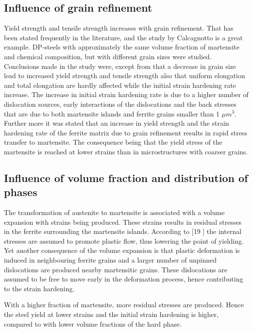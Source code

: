 \documentclass{article}
\begin{document}
\subsection{Influence of grain refinement}
Yield strength and tensile strength increases with grain refinement. That has been stated frequently in the literature, and the study by Calcagnotto is a great example. DP-steels with approximately the same volume fraction of martensite and chemical composition, but with different grain sizes were studied. Conclusions made in the study were, except from that a decrease in grain size lead to increased yield strength and tensile strength also that uniform elongation and total elongation are hardly affected while the initial strain hardening rate increase. The increase in initial strain hardening rate is due to a higher number of dislocation sources, early interactions of the dislocations and the back stresses that are due to both martensite islands and ferrite grains smaller than 1 $\mu m^3$. Further more it was stated that an increase in yield strength and the strain hardening rate of the ferrite matrix due to grain refinement results in rapid stress transfer to martensite. The consequence being that the yield stress of the martensite is reached at lower strains than in microstructures with coarser grains. 

\subsection{Influence of volume fraction and distribution of phases}
The transformation of austenite to martensite is associated with a volume expansion with strains being produced. These strains results in residual stresses in the ferrite surrounding the martensite islands. According to [19 ] the internal stresses are assumed to promote plastic flow, thus lowering the point of yielding. Yet another consequence of the volume expansion is that plastic deformation is induced in neighbouring ferrite grains and a larger number of unpinned dislocations are produced nearby martensitic grains. These dislocations are assumed to be free to move early in the deformation process, hence contributing to the strain hardening. 

With a higher fraction of martensite, more residual stresses are produced. Hence the steel yield at lower strains and the initial strain hardening is higher, compared to with lower volume fractions of the hard phase. 
\end{document}
